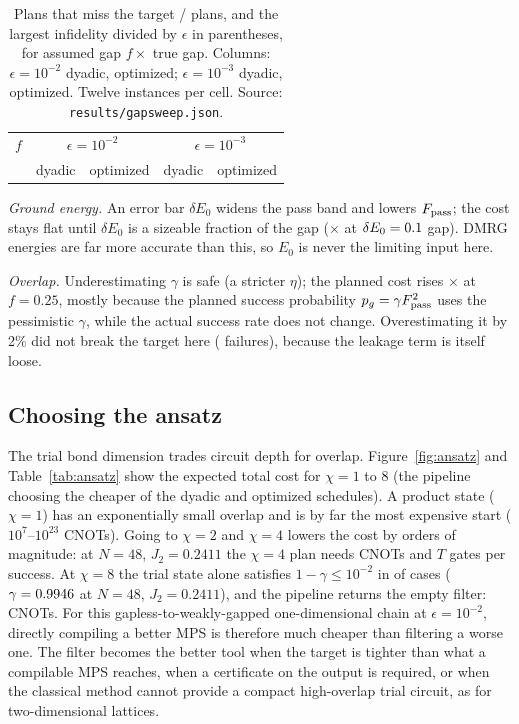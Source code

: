 \documentclass[aps,pra,twocolumn,superscriptaddress,nofootinbib]{revtex4-2}
\begin{document}
\begin{table}[t]
\caption{Plans that miss the target / plans, and the largest infidelity divided by $\epsilon$ in parentheses, for assumed gap $f\times$ true gap.
Columns: $\epsilon=10^{-2}$ dyadic, optimized; $\epsilon=10^{-3}$ dyadic, optimized. Twelve instances per cell. Source: \texttt{results/gapsweep.json}.}
\label{tab:gapsweep}
\begin{ruledtabular}
\begin{tabular}{rllll}
$f$ & \multicolumn{2}{c}{$\epsilon=10^{-2}$} & \multicolumn{2}{c}{$\epsilon=10^{-3}$}\\
 & dyadic & optimized & dyadic & optimized\\
\midrule

\end{tabular}
\end{ruledtabular}
\end{table}

\emph{Ground energy.} An error bar $\delta E_0$ widens the pass band and lowers $F_{\rm pass}$; the
cost stays flat until $\delta E_0$ is a sizeable fraction of the gap (\eZeroHiCost$\times$ at
$\delta E_0=0.1$ gap). DMRG energies are far more accurate than this, so $E_0$ is never the
limiting input here.

\emph{Overlap.} Underestimating $\gamma$ is safe (a stricter $\eta$); the planned cost rises
\gammaLowCost$\times$ at $f=0.25$, mostly because the planned success probability $p_g=\gamma F_{\rm
pass}^2$ uses the pessimistic $\gamma$, while the actual success rate does not change. Overestimating
it by 2\% did not break the target here (\nGammaFail{} failures), because the leakage term is itself
loose.

\subsection{Choosing the ansatz}

The trial bond dimension trades circuit depth for overlap. Figure~\ref{fig:ansatz} and
Table~\ref{tab:ansatz} show the expected total cost for $\chi=1$ to 8 (the pipeline choosing the
cheaper of the dyadic and optimized schedules). A product state ($\chi=1$) has an exponentially small
overlap and is by far the most expensive start ($10^{7}$--$10^{23}$ CNOTs). Going to $\chi=2$ and
$\chi=4$ lowers the cost by orders of magnitude: at $N=48$, $J_2=0.2411$ the $\chi=4$ plan needs
\cnotFortyEightChiFour{} CNOTs and \tFortyEightChiFour{} $T$ gates per success. At $\chi=8$ the trial
state alone satisfies $1-\gamma\le10^{-2}$ in \nNoFilterChiEight{} of \nChiEight{} cases
($\gamma=0.9946$ at $N=48$, $J_2=0.2411$), and the pipeline returns the empty filter:
\cnotFortyEightChiEight{} CNOTs. For this gapless-to-weakly-gapped one-dimensional chain at
$\epsilon=10^{-2}$, directly compiling a better MPS is therefore much cheaper than filtering a worse
one. The filter becomes the better
tool when the target is tighter than what a compilable MPS reaches, when a certificate on the output
is required, or when the classical method cannot provide a compact high-overlap trial circuit, as for
two-dimensional lattices.
\end{document}

